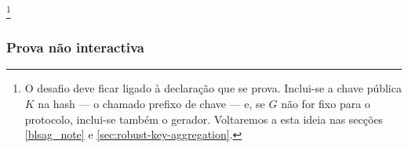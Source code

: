 \footnote{O desafio deve ficar ligado à declaração que se prova. Inclui-se a
chave pública \(K\) na hash --- o chamado prefixo de chave --- e, se \(G\) não
for fixo para o protocolo, inclui-se também o gerador. Voltaremos a esta ideia
nas secções \ref{blsag_note} e \ref{sec:robust-key-aggregation}.}

\subsubsection*{Prova não interactiva}

\begin{center}
\end{center}

